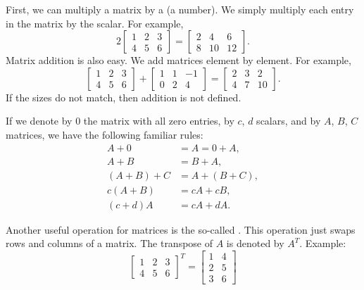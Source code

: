 \documentclass{ximera}
\begin{document}
First, we can multiply a matrix by a \emph{} (a number). We simply multiply each entry in the matrix by the scalar.  For example, 
\begin{equation*}
    2
    \begin{bmatrix}
        1 & 2 & 3 \\
        4 & 5 & 6
    \end{bmatrix} =
    \begin{bmatrix}
        2 & 4 & 6 \\
        8 & 10 & 12
    \end{bmatrix} .
\end{equation*}
Matrix addition is also easy. We add matrices element by element. For example,
\begin{equation*}
    \begin{bmatrix}
        1 & 2 & 3 \\
        4 & 5 & 6
    \end{bmatrix} +
    \begin{bmatrix}
        1 & 1 & -1 \\
        0 & 2 & 4
    \end{bmatrix}
    =
    \begin{bmatrix}
        2 & 3 & 2 \\
        4 & 7 & 10
    \end{bmatrix} .
\end{equation*}
If the sizes do not match, then addition is not defined.

If we denote by 0 the matrix with all zero entries, by $c$, $d$ scalars, and by $A$, $B$, $C$ matrices, we have the following familiar rules:
\begin{align*}
    A + 0 & = A = 0 + A , \\
    A + B & = B + A , \\
    (A + B) + C & = A + (B + C) , \\
    c(A+B) & = cA+cB, \\
    (c+d)A & = cA + dA.
\end{align*}

Another useful operation for matrices is the so-called \emph{}.  This operation just swaps rows and columns of a matrix. The transpose of $A$ is denoted by $A^T$.  Example:
\begin{equation*}
    \begin{bmatrix}
        1 & 2 & 3 \\
        4 & 5 & 6
    \end{bmatrix}^T =
    \begin{bmatrix}
        1 & 4 \\
        2 & 5 \\
        3 & 6 
    \end{bmatrix}
\end{equation*}
\end{document}
